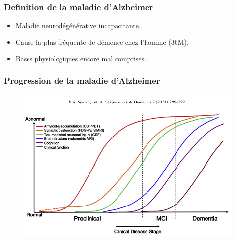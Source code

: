 \documentclass{beamer}
\begin{document}
%
\begin{frame}
\frametitle{Definition de la maladie d'Alzheimer}
\begin{itemize}
\item Maladie neurodégénérative incapacitante.
\item Cause la plus fréquente de démence chez l’homme (36M). 
\item Bases physiologiques encore mal comprises.
\end{itemize}
\end{frame}


\begin{frame}
\frametitle{Progression de la maladie d'Alzheimer}
\begin{figure}[H]
\begin{center}
\includegraphics[scale=0.7]{../figures/ad_progression.png}
\end{center}
\label{fig_biomarker_model}
\end{figure}
\end{frame}
\end{document}
